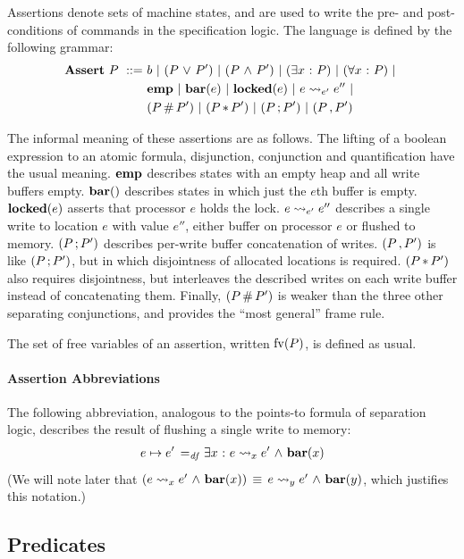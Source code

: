 \documentclass[11pt]{report}
\begin{document}
Assertions denote sets of machine states, and are used to write the pre- and post-conditions of commands in the specification logic. The language is defined by the following grammar: \begin{align*}
	\mathbf{Assert}~P ~::=~ & b ~|~ (P \operatorname{\,\vee\,} P') ~|~ (P \operatorname{\,\wedge\,} P') ~|~ (\exists x \operatorname{\,:\,} P) ~|~ (\forall x \operatorname{\,:\,} P) ~|~ \\
	& \mathbf{emp} ~|~ \mathbf{bar}(e) ~|~ \mathbf{locked}(e) ~|~ e \leadsto_{e'} e'' ~|~  \\ 
	& (P \operatorname{\#} P') ~|~ (P \operatorname{\ast} P') ~|~ (P \operatorname{;} P') ~|~ (P \operatorname{,} P')
\end{align*} 

The informal meaning of these assertions are as follows. The lifting of a boolean expression to an atomic formula, disjunction, conjunction and quantification have the usual meaning. $\mathbf{emp}$ describes states with an empty heap and all write buffers empty. $\fbar$ describes states in which just the $e$th buffer is empty. $\mathbf{locked}(e)$ asserts that processor $e$ holds the lock. $e \leadsto_{e'} e''$ describes a single write to location $e$ with value $e''$, either buffer on processor $e$ or flushed to memory. $(P \operatorname{;} P')$ describes per-write buffer concatenation of writes. $(P \operatorname{,} P')$ is like $(P \operatorname{;} P')$, but in which disjointness of allocated locations is required. $(P \operatorname{\ast} P')$ also requires disjointness, but interleaves the described writes on each write buffer instead of concatenating them. Finally, $(P \operatorname{\#} P')$ is weaker than the three other separating conjunctions, and provides the ``most general'' frame rule. 

The set of free variables of an assertion, written $\mathrm{fv}(P)$, is defined as usual. 

\paragraph{Assertion Abbreviations} The following abbreviation, analogous to the points-to formula of separation logic, describes the result of flushing a single write to memory: \begin{align*}
	e \mapsto e' \operatorname{\;=_{\mathit{df}}\;} & \exists x \operatorname{\,:\,} e \leadsto_{x} e' \operatorname{\,\wedge\,} \mathbf{bar}(x)\\
\end{align*} (We will note later that $(e \leadsto_{x} e' \operatorname{\,\wedge\,} \mathbf{bar}(x))\,\equiv\, e \leadsto_{y} e' \operatorname{\,\wedge\,} \mathbf{bar}(y)$, which justifies this notation.) 

\subsection{Predicates}
\label{sec:predicates}
\end{document}

